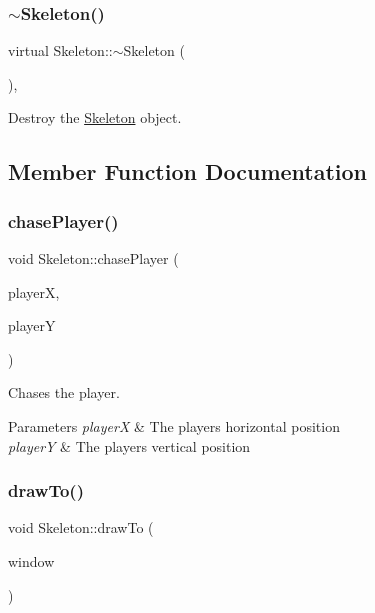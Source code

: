\subsubsection{\texorpdfstring{$\sim$Skeleton()}{~Skeleton()}}
{\footnotesize\ttfamily virtual Skeleton\+::$\sim$\+Skeleton (\begin{DoxyParamCaption}{ }\end{DoxyParamCaption})\hspace{0.3cm}{\ttfamily [virtual]}, {\ttfamily [default]}}



Destroy the \mbox{\hyperlink{classSkeleton}{Skeleton}} object. 



\subsection{Member Function Documentation}
\mbox{\label{classSkeleton_aefa4683beb507bafaa2b20eaba4f478d}} 
\subsubsection{\texorpdfstring{chasePlayer()}{chasePlayer()}}
{\footnotesize\ttfamily void Skeleton\+::chase\+Player (\begin{DoxyParamCaption}\item[{float}]{playerX,  }\item[{float}]{playerY }\end{DoxyParamCaption})}



Chases the player. 


\begin{DoxyParams}{Parameters}
{\em playerX} & The players horizontal position \\
\hline
{\em playerY} & The players vertical position \\
\hline
\end{DoxyParams}
\mbox{\label{classSkeleton_aa39ac09590a5274536dc2fc125cc62e6}} 
\subsubsection{\texorpdfstring{drawTo()}{drawTo()}}
{\footnotesize\ttfamily void Skeleton\+::draw\+To (\begin{DoxyParamCaption}\item[{sf\+::\+Render\+Window \&}]{window }\end{DoxyParamCaption})\hspace{0.3cm}{\ttfamily [virtual]}}



